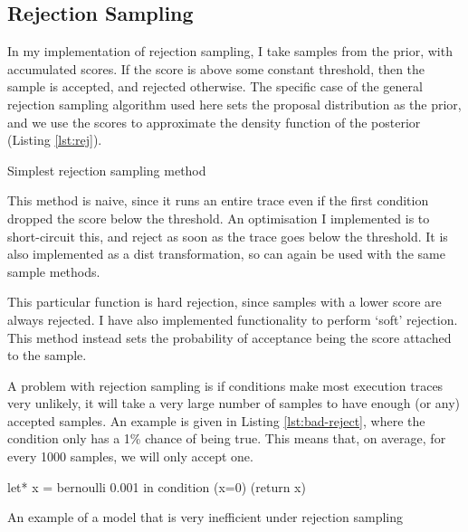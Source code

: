 \documentclass[sigconf]{acmart}
\begin{document}
\subsection{Rejection Sampling} \label{sec:rej}
In my implementation of rejection sampling, I take samples from the prior, with accumulated scores. If the score is above some constant threshold, then the sample is accepted, and rejected otherwise. The specific case of the general rejection sampling algorithm used here sets the proposal distribution as the prior, and we use the scores to approximate the density function of the posterior (Listing \ref{lst:rej}).

\begin{listing}[!htb]
  \centering
  \caption{Simplest rejection sampling method}
  \label{lst:rej}
\end{listing}

This method is naive, since it runs an entire trace even if the first condition dropped the score below the threshold. An optimisation I implemented is to short-circuit this, and reject as soon as the trace goes below the threshold. It is also implemented as a dist transformation, so can again be used with the same sample methods.

This particular function is hard rejection, since samples with a lower score are always rejected. I have also implemented functionality to perform `soft' rejection. This method instead sets the probability of acceptance being the score attached to the sample.

A problem with rejection sampling is if conditions make most execution traces very unlikely, it will take a very large number of samples to have enough (or any) accepted samples. An example is given in Listing \ref{lst:bad-reject}, where the condition only has a 1\% chance of being true. This means that, on average, for every 1000 samples, we will only accept one.

\begin{listing}[!htb]
  \centering
  \begin{ocamlcode-in}
    let* x = bernoulli 0.001 in
    condition (x=0)
    (return x)
  \end{ocamlcode-in}

  \caption{An example of a model that is very inefficient under rejection sampling}
  \label{lst:bad-reject}
\end{listing}
%
\end{document}
